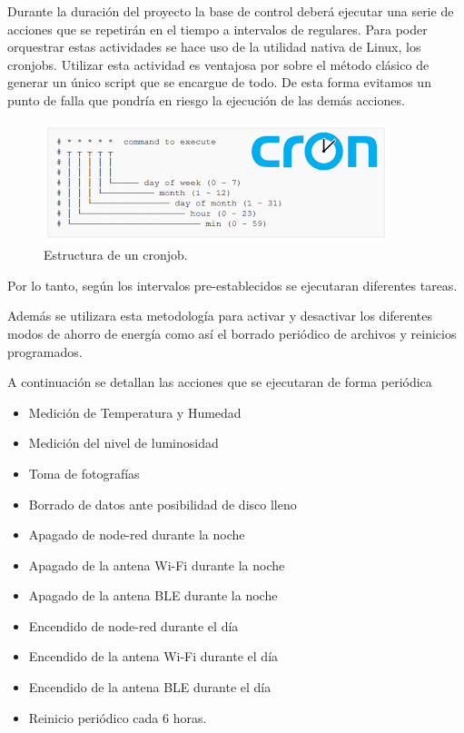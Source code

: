 Durante la duración del proyecto la base de control deberá ejecutar una serie de acciones que se repetirán en el tiempo a intervalos de regulares. Para poder orquestrar estas actividades se hace uso de la utilidad nativa de Linux, los cronjobs. 
Utilizar esta actividad es ventajosa por sobre el método clásico de generar un único script que se encargue de todo. De esta forma evitamos un punto de falla que pondría en riesgo la ejecución de las demás acciones. 

\begin{figure}[H]
	\centering
	\includegraphics[width=0.7\linewidth]{"../Ingenieria de Detalle/ImagenesIngenieria de Detalle/cron"}
	\caption{Estructura de un cronjob.}
	\label{fig:cron}
\end{figure}

Por lo tanto, según los intervalos pre-establecidos se ejecutaran diferentes tareas.

Además se utilizara esta metodología para activar y desactivar los diferentes modos de ahorro de energía como así el borrado periódico de archivos y reinicios programados.

A continuación se detallan las acciones que se ejecutaran de forma periódica  
\begin{itemize}
	\item Medición de Temperatura y Humedad
	\item Medición del nivel de luminosidad
	\item Toma de fotografías
	\item Borrado de datos ante posibilidad de disco lleno
	\item Apagado de node-red durante la noche
	\item Apagado de la antena Wi-Fi durante la noche
	\item Apagado de la antena BLE durante la noche
	\item Encendido de node-red durante el día
	\item Encendido de la antena Wi-Fi durante el día
	\item Encendido de la antena BLE durante el día
	\item Reinicio periódico cada 6 horas.
\end{itemize}










